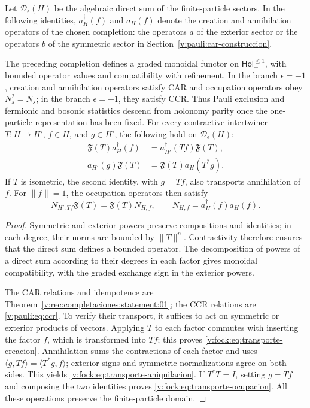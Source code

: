 Let \(\mathcal D_\epsilon(H)\) be the algebraic direct sum of the
finite-particle sectors. In the following identities, \(a_H^\dagger(f)\)
and \(a_H(f)\) denote the creation and annihilation operators of the
chosen completion: the operators \(a\) of the exterior sector or the
operators \(b\) of the symmetric sector in
Section~\ref{v:pauli:car-construccion}.

\begin{theorem}
\label{v:rec:fock_gibbs:statement:01}
The preceding completion defines a graded monoidal functor on
\(\mathsf{Hol}_{\pm}^{\leq1}\), with bounded operator values and
compatibility with refinement. In the branch \(\epsilon=-1\), creation and
annihilation operators satisfy CAR and occupation operators obey
\(N_s^2=N_s\); in the branch \(\epsilon=+1\), they satisfy CCR. Thus
Pauli exclusion and fermionic and bosonic statistics descend from
holonomy parity once the one-particle representation has been fixed.
For every contractive intertwiner \(T:H\to H'\), \(f\in H\), and
\(g\in H'\), the following hold on \(\mathcal D_\epsilon(H)\):
\begin{align}
 \mathfrak F(T)a_H^\dagger(f)
 &=a_{H'}^\dagger(Tf)\mathfrak F(T),
 \label{v:fock:eq:transporte-creacion}\\
 a_{H'}(g)\mathfrak F(T)
 &=\mathfrak F(T)a_H(T^*g).
 \label{v:fock:eq:transporte-aniquilacion}
\end{align}
If \(T\) is isometric, the second identity, with \(g=Tf\), also transports
annihilation of \(f\). For \(\|f\|=1\), the occupation operators
then satisfy
\begin{equation}
 N_{H',Tf}\mathfrak F(T)=\mathfrak F(T)N_{H,f},
 \qquad N_{H,f}=a_H^\dagger(f)a_H(f).
 \label{v:fock:eq:transporte-ocupacion}
\end{equation}
\end{theorem}

\begin{proof}
Symmetric and exterior powers preserve compositions and identities;
in each degree, their norms are bounded by \(\|T\|^n\). Contractivity
therefore ensures that the direct sum defines a bounded operator. The
decomposition of powers of a direct sum according to their degrees in each
factor gives monoidal compatibility, with the graded exchange sign
in the exterior powers.

The CAR relations and idempotence are
Theorem~\ref{v:rec:completaciones:statement:01}; the CCR relations are
\eqref{v:pauli:eq:ccr}. To verify their transport, it suffices to act on
symmetric or exterior products of vectors. Applying \(T\) to each factor
commutes with inserting the factor \(f\), which is transformed into \(Tf\);
this proves \eqref{v:fock:eq:transporte-creacion}. Annihilation sums the
contractions of each factor and uses
\(\langle g,Tf\rangle=\langle T^*g,f\rangle\); exterior signs and
symmetric normalizations agree on both sides. This yields
\eqref{v:fock:eq:transporte-aniquilacion}. If \(T^*T=I\), setting \(g=Tf\)
and composing the two identities proves
\eqref{v:fock:eq:transporte-ocupacion}. All these operations preserve
the finite-particle domain.
\end{proof}

